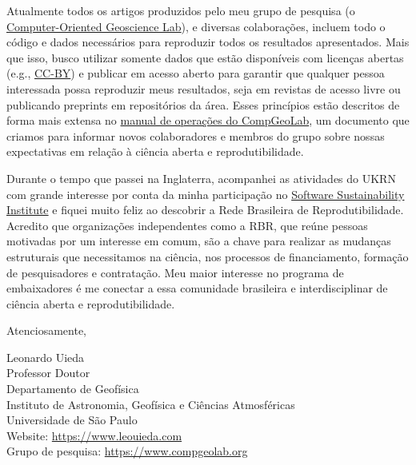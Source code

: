 \documentclass[a4paper,onecolumn,10pt]{article}
\newcommand{\Nome}{Leonardo Uieda}
\newcommand{\Cargo}{Professor Doutor}
\newcommand{\Padding}{\vspace{0.5cm}}
\begin{document}
Atualmente todos os artigos produzidos pelo meu grupo de pesquisa
(o \href{https://www.compgeolab.org/}{Computer-Oriented Geoscience Lab}),
e diversas colaborações, incluem todo o código e dados necessários para
reproduzir todos os resultados apresentados.
Mais que isso, busco utilizar somente dados que estão disponíveis com licenças
abertas (e.g., \href{https://creativecommons.org/licenses/by/4.0/}{CC-BY})
e publicar em acesso aberto para garantir que qualquer pessoa interessada
possa reproduzir meus resultados, seja em revistas de acesso livre ou
publicando preprints em repositórios da área.
Esses princípios estão descritos de forma mais extensa no
\href{https://www.compgeolab.org/manual/}{manual de operações do CompGeoLab},
um documento que criamos para informar novos colaboradores e membros
do grupo sobre nossas expectativas em relação à ciência aberta e
reprodutibilidade.

Durante o tempo que passei na Inglaterra, acompanhei as atividades do UKRN com
grande interesse por conta  da minha participação no
\href{https://www.leouieda.com/blog/ssi-fellowship.html}{Software
Sustainability Institute} e fiquei muito feliz ao descobrir a Rede Brasileira
de Reprodutibilidade.
Acredito que organizações independentes como a RBR, que reúne pessoas motivadas
por um interesse em comum, são a chave para realizar as mudanças estruturais
que necessitamos na ciência, nos processos de financiamento, formação de
pesquisadores e contratação.
Meu maior interesse no programa de embaixadores é me conectar a essa comunidade
brasileira e interdisciplinar de ciência aberta e reprodutibilidade.


\Padding

\begin{flushleft}
  Atenciosamente,

  \Padding
  \Nome{}
  \\[0.25cm]
  {
    \color{mediumgray}
    \small
    \Cargo
    \\
    Departamento de Geofísica
    \\
    Instituto de Astronomia, Geofísica e Ciências Atmosféricas
    \\
    Universidade de São Paulo
    \\
    Website: \url{https://www.leouieda.com}
    \\
    Grupo de pesquisa: \url{https://www.compgeolab.org}
  }
\end{flushleft}
\end{document}
